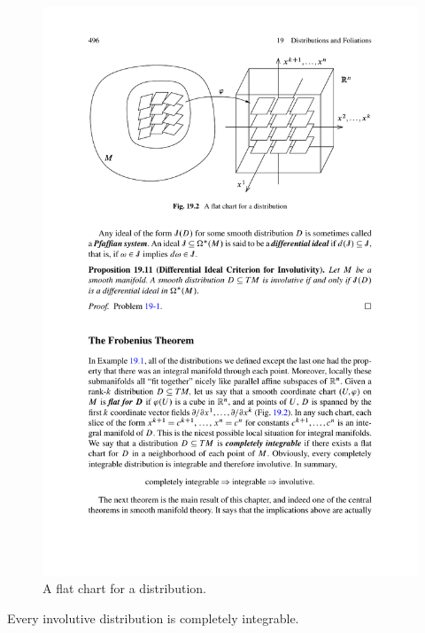 \begin{figure}[htbp]
\centering
\includegraphics{pictures/flat-chart}
\caption{A flat chart for a distribution.}
\end{figure}
\begin{theorem}
Every involutive distribution is completely integrable.
\end{theorem}
